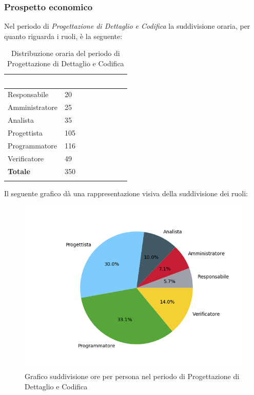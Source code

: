 \subsubsection{Prospetto economico}

Nel periodo di \textit{Progettazione di Dettaglio e Codifica} la suddivisione oraria, per quanto riguarda i ruoli, è la seguente: 

\begin{longtable}{| C{.30\textwidth}| C{.15\textwidth}| C{.20\textwidth}|}
	\hline
	\textbf{\textcolor{white}{Ruolo}} & \textbf{\textcolor{white}{Ore}} & \textbf{\textcolor{white}{Costo in \euro}} \\
	\hline 
	Responsabile & 20 &  \\
	\hline
	Amministratore & 25 & \\
	\hline
	Analista & 35 &  \\
	\hline
	Progettista & 105 &  \\
	\hline
	Programmatore & 116 &  \\
	\hline
	Verificatore & 49 &  \\
	\hline
	\textbf{Totale} & 350 & \\ 
	\hline
	
	\caption{Distribuzione oraria del periodo di Progettazione di Dettaglio e Codifica}
	\label{Distribuzione oraria pdc}
\end{longtable}

Il seguente grafico dà una rappresentazione visiva della suddivisione dei ruoli:
\begin{figure}[H]
	\centering
	\includegraphics[width=1\linewidth]{./images/torta_pdc.png}
	\caption{Grafico suddivisione ore per persona nel periodo di Progettazione di Dettaglio e Codifica}
	\label{fig:grafico suddivione ruoli periodo pdc}
\end{figure}


